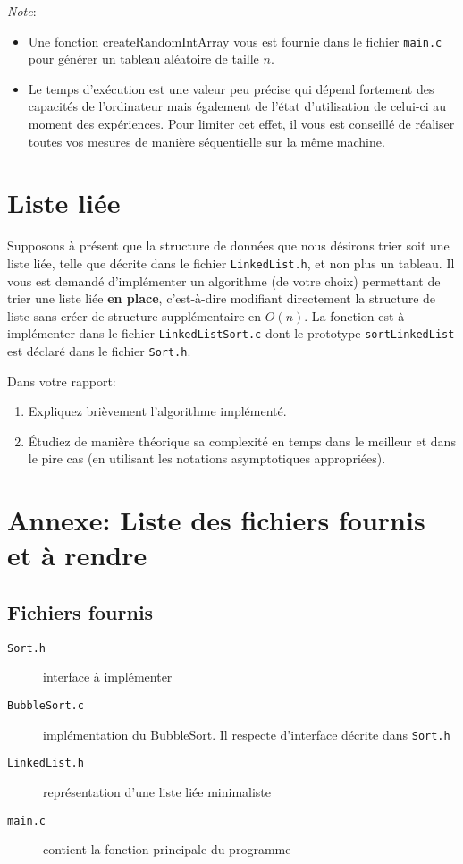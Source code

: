 \documentclass[a4paper,10pt]{article}
\begin{document}
{\em Note}: 
\begin{itemize}
\item Une fonction createRandomIntArray vous est fournie dans le
  fichier \texttt{main.c} pour générer un tableau aléatoire de taille
  $n$.
\item Le temps d'exécution est une valeur peu précise qui dépend
  fortement des capacités de l'ordinateur mais également de l'état
  d'utilisation de celui-ci au moment des expériences. Pour limiter
  cet effet, il vous est conseillé de réaliser toutes vos mesures de
  manière séquentielle sur la même machine.
\end{itemize}

\section{Liste liée}

Supposons à présent que la structure de données que nous désirons
trier soit une liste liée, telle que décrite dans le fichier
\texttt{LinkedList.h}, et non plus un tableau. Il vous est demandé
d'implémenter un algorithme (de votre choix) permettant de trier une
liste liée {\bf en place}, c'est-à-dire modifiant directement la
structure de liste sans créer de structure supplémentaire en
$O(n)$. La fonction est à implémenter dans le fichier
\texttt{LinkedListSort.c} dont le prototype \texttt{sortLinkedList}
est déclaré dans le fichier \texttt{Sort.h}.


Dans votre rapport:
\begin{enumerate}
\item Expliquez brièvement l'algorithme implémenté.
\item \'Etudiez de manière théorique sa complexité en temps dans le meilleur et dans le pire cas
(en utilisant les notations asymptotiques appropriées).
\end{enumerate}

\section*{Annexe: Liste des fichiers fournis et à rendre}

\subsection*{Fichiers fournis}
\begin{description}
\item[\texttt{Sort.h}] interface à implémenter
\item[\texttt{BubbleSort.c}] implémentation du BubbleSort. Il respecte d'interface décrite dans \texttt{Sort.h}
\item[\texttt{LinkedList.h}] représentation d'une liste liée minimaliste
\item[\texttt{main.c}] contient la fonction principale du programme
\end{description}
\end{document}
